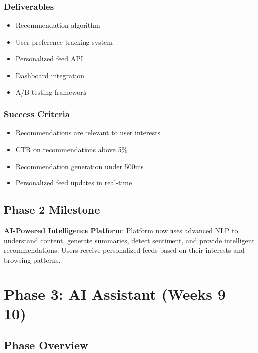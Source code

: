 \documentclass[12pt,oneside]{report}
\begin{document}
\subsubsection{Deliverables}

\begin{itemize}
    \item Recommendation algorithm
    \item User preference tracking system
    \item Personalized feed API
    \item Dashboard integration
    \item A/B testing framework
\end{itemize}

\subsubsection{Success Criteria}

\begin{itemize}
    \item Recommendations are relevant to user interests
    \item CTR on recommendations above 5\%
    \item Recommendation generation under 500ms
    \item Personalized feed updates in real-time
\end{itemize}

\subsection{Phase 2 Milestone}

\textbf{AI-Powered Intelligence Platform}: Platform now uses advanced NLP to understand content, generate summaries, detect sentiment, and provide intelligent recommendations. Users receive personalized feeds based on their interests and browsing patterns.


\section{Phase 3: AI Assistant (Weeks 9--10)}

\subsection{Phase Overview}
\end{document}
